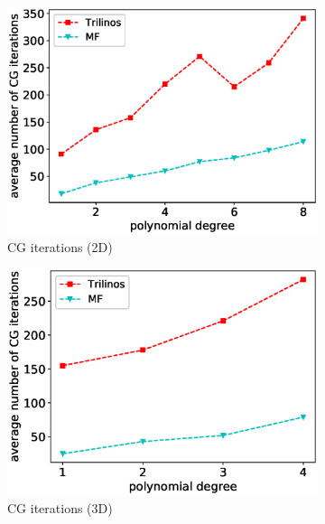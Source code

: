 \documentclass[AMA,STIX1COL]{WileyNJD-v2}
\begin{document}
\begin{figure}[!ht]
  \begin{subfigure}[b]{0.49\textwidth}
    \centering
    \includegraphics[width=\textwidth]{CSL_Munich_cg2d.eps}
    \caption{CG iterations (2D)}
    \label{fig:benchmark_miehe_Emmy_cg2}
  \end{subfigure}
  \begin{subfigure}[b]{0.49\textwidth}
    \centering
    \includegraphics[width=\textwidth]{CSL_Munich_cg3d.eps}
    \caption{CG iterations (3D)}
    \label{fig:benchmark_miehe_Emmy_cg3}
  \end{subfigure}
  ~
  \begin{subfigure}[b]{0.49\textwidth}
    \centering

\end{subfigure}
\end{figure}
\end{document}
